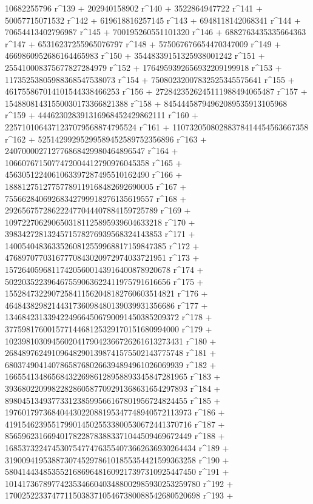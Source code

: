        10682255796 r^139 + 202940158902 r^140 + 3522864947722 r^141 + 
       50057715071532 r^142 + 619618816257145 r^143 + 
       6948118142068341 r^144 + 70654413402796987 r^145 + 
       700195260551101320 r^146 + 6882763435335664363 r^147 + 
       65316237255965076797 r^148 + 575067676654470347009 r^149 + 
       4669860952686164465983 r^150 + 35448339151325938001242 r^151 + 
       255410008375677827284979 r^152 + 
       1764959392656932209199918 r^153 + 
       11735253805988368547538073 r^154 + 
       75080232007832525345575641 r^155 + 
       461755867014101544338466253 r^156 + 
       2728423526245111988494065487 r^157 + 
       15488081431550030173366821388 r^158 + 
       84544458794962089535913105968 r^159 + 
       444623028391316968452429862111 r^160 + 
       2257101064371237079568874795524 r^161 + 
       11073205080288378414454563667358 r^162 + 
       52514299295299589452589752356896 r^163 + 
       240700002712776868429980464896547 r^164 + 
       1066076715077472004412790976045358 r^165 + 
       4563051224061063397287495510162490 r^166 + 
       18881275127757789119168482692690005 r^167 + 
       75566284069268342799918276135619557 r^168 + 
       292656757286222477044407884159725789 r^169 + 
       1097227062906503181125895939604633218 r^170 + 
       3983427281324571578276939568324143853 r^171 + 
       14005404836335260812559968817159847385 r^172 + 
       47689707703167770843020972974033721951 r^173 + 
       157264059681174205600143916400878920678 r^174 + 
       502203522396467559063622411975791616656 r^175 + 
       1552847322907258411562048182760603514821 r^176 + 
       4648438298214431736098480139039931356686 r^177 + 
       13468423133942249664506790091450385209372 r^178 + 
       37759817600157714468125329170151680994000 r^179 + 
       102398103094560204179042366726261613273431 r^180 + 
       268489762491096482901398741575502143775748 r^181 + 
       680374904140786587680266394894961026069939 r^182 + 
       1665541348656843226986128958893345847281965 r^183 + 
       3936802209982282860587709291368631654297893 r^184 + 
       8980451349377331238599566167801956724824455 r^185 + 
       19760179736840443022088195347748940572113973 r^186 + 
       41915462395517990145025533800530672441370716 r^187 + 
       85659623166940178228783883371044509469672449 r^188 + 
       168537322474530754774763554073662636930264434 r^189 + 
       319009419538873074529786101855354421599363258 r^190 + 
       580414434853552168696481609217397310925447450 r^191 + 
       1014173678977423534660403488002985930253259780 r^192 + 
       1700252233747711503837105467380088542680520698 r^193 + 
